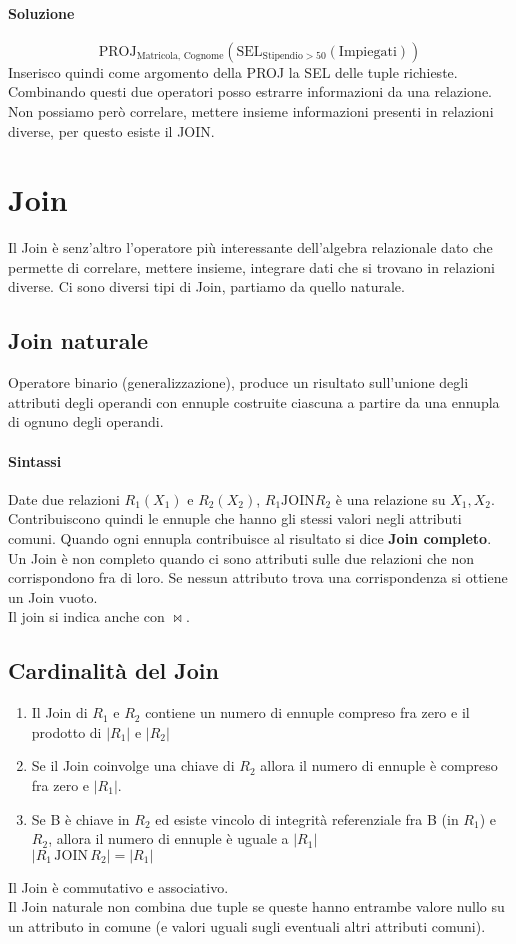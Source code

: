 \paragraph*{Soluzione}
\begin{equation*}
    \text{PROJ}_{\text{Matricola, Cognome}}(\text{SEL}_{\text{Stipendio} > 50}(\text{Impiegati}))
\end{equation*}
Inserisco quindi come argomento della PROJ la SEL delle tuple richieste. Combinando questi due
operatori posso estrarre informazioni da una relazione. Non possiamo però correlare,
mettere insieme informazioni presenti in relazioni diverse, per questo esiste il JOIN.

\section{Join}
Il Join è senz'altro l'operatore più interessante dell'algebra relazionale dato che permette
di correlare, mettere insieme, integrare dati che si trovano in relazioni diverse. Ci sono
diversi tipi di Join, partiamo da quello naturale.
\subsection*{Join naturale}
Operatore binario (generalizzazione), produce un risultato sull'unione degli attributi
degli operandi con ennuple costruite ciascuna a partire da una ennupla di ognuno degli operandi.
\paragraph*{Sintassi} Date due relazioni $R_1(X_1)$ e $R_2(X_2)$, $R_1 \text{JOIN} R_2$ è una
relazione su $X_1, X_2$. Contribuiscono quindi le ennuple che hanno gli stessi valori negli attributi
comuni. Quando ogni ennupla contribuisce al risultato si dice \textbf{Join completo}.\\
Un Join è non completo quando ci sono attributi sulle due relazioni che non corrispondono fra di loro. Se
nessun attributo trova una corrispondenza si ottiene un Join vuoto.\\
Il join si indica anche con $\bowtie$.
\subsection*{Cardinalità del Join}
\begin{enumerate}
    \item Il Join di $R_1$ e $R_2$ contiene un numero di ennuple compreso fra zero e il prodotto di $|R_1|$
    e $|R_2|$
    \item Se il Join coinvolge una chiave di $R_2$ allora il numero di ennuple è compreso fra zero e $|R_1|$.
    \item Se B è chiave in $R_2$ ed esiste vincolo di integrità referenziale fra
    B (in $R_1$) e $R_2$, allora il numero di ennuple è uguale a $|R_1|$\\ $|R_1 \,\text{JOIN}\, R_2| = |R_1|$
\end{enumerate}
Il Join è commutativo e associativo.\\
Il Join naturale non combina due tuple se queste hanno entrambe valore nullo su un attributo in
comune (e valori uguali sugli eventuali altri attributi comuni).
